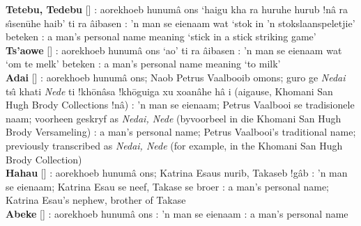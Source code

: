 \textbf{Tetebu, Tedebu} [] :
aorekhoeb \textdoublebarpipe{}hunum\^{a} \textvertline{}ons `haigu
\textvertline{}kha ra \textvertline{}huruhe \textvertline{}hurub
!n\^{a} ra s\^{\i}sen\={u}he haib' ti ra
\textdoublebarpipe{}\^{a}ibasen : 'n man se eienaam wat
`stok in 'n stokslaanspeletjie' beteken : a man's
personal name meaning `stick in a stick striking game' \\

\textbf{Ts'aowe} [] :
aorekhoeb \textdoublebarpipe{}hunum\^{a} \textvertline{}ons
`\textvertline{}ao' ti ra \textdoublebarpipe{}\^{a}ibasen
: 'n man se eienaam wat `om te melk' beteken
: a man's personal name meaning `to milk' \\

\textbf{\textvertline{}Adai} []
: aorekhoeb \textdoublebarpipe{}hunum\^{a}
\textvertline{}ons; \textdoublevertline{}Naob Petrus Vaalbooib
om\textvertline{}ons; \textdoublebarpipe{}guro ge
\emph{N\textvertline{}edai} ts\^{\i} \textdoublevertline{}khati
\emph{N\textvertline{}ede} ti !kh\={o}\textdoublevertline{}n\^{a}sa
!kh\={o}\textdoublevertline{}guiga xu xoa\textdoublevertline{}n\^{a}he
h\^{a} i (ai\textdoublevertline{}gause, \textdoublebarpipe{}Khomani
San Hugh Brody Collections !n\^{a}) : 'n man se eienaam;
Petrus Vaalbooi se tradisionele naam; voorheen geskryf as
\emph{N\textvertline{}edai, N\textvertline{}ede} (byvoorbeel in die
\textdoublebarpipe{}Khomani San Hugh Brody Versameling)
: a man's personal name; Petrus Vaalbooi's traditional
name; previously transcribed as \emph{N\textvertline{}edai,
N\textvertline{}ede} (for example, in the \textdoublebarpipe{}Khomani
San Hugh Brody Collection) \\

\textbf{\textvertline{}Ha\textvertline{}hau}
[]
: aorekhoeb \textdoublebarpipe{}hunum\^{a}
\textvertline{}ons; Katrina Esaus \textdoublevertline{}nurib, Takaseb
!g\^{a}b : 'n man se eienaam; Katrina Esau se neef,
Takase se broer : a man's personal name; Katrina Esau's
nephew, brother of Takase \\

\textbf{\textdoublevertline{}Abeke}
[] :
aorekhoeb \textdoublebarpipe{}hunum\^{a} \textvertline{}ons
: 'n man se eienaam : a man's personal
name \\

